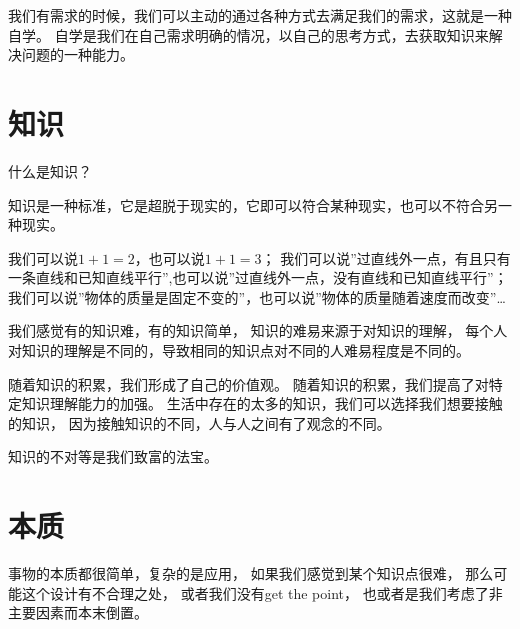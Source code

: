 我们有需求的时候，我们可以主动的通过各种方式去满足我们的需求，这就是一种自学。
自学是我们在自己需求明确的情况，以自己的思考方式，去获取知识来解决问题的一种能力。







\section{知识}
什么是知识？

知识是一种标准，它是超脱于现实的，它即可以符合某种现实，也可以不符合另一种现实。

我们可以说$1+1=2$，也可以说$1+1=3$；
我们可以说''过直线外一点，有且只有一条直线和已知直线平行'',也可以说''过直线外一点，没有直线和已知直线平行''；
我们可以说''物体的质量是固定不变的''，也可以说''物体的质量随着速度而改变''\dots



我们感觉有的知识难，有的知识简单，
知识的难易来源于对知识的理解，
每个人对知识的理解是不同的，导致相同的知识点对不同的人难易程度是不同的。

随着知识的积累，我们形成了自己的价值观。
随着知识的积累，我们提高了对特定知识理解能力的加强。
生活中存在的太多的知识，我们可以选择我们想要接触的知识，
因为接触知识的不同，人与人之间有了观念的不同。

知识的不对等是我们致富的法宝。


\section{本质}

事物的本质都很简单，复杂的是应用，
如果我们感觉到某个知识点很难，
那么可能这个设计有不合理之处，
或者我们没有get the point，
也或者是我们考虑了非主要因素而本末倒置。